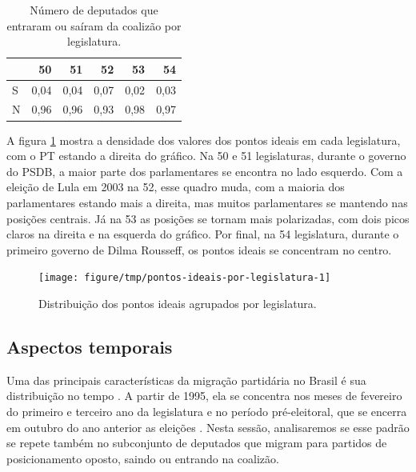 \documentclass[a4paper,titlepage]{ppgi}\usepackage[]{graphicx}\usepackage[]{color}
\newenvironment{knitrout}{}{} %
\begin{document}
\begin{table}
\centering
\begin{knitrout}
\color{fgcolor}
\begin{tabular}{l|r|r|r|r|r}
\hline
  & 50 & 51 & 52 & 53 & 54\\
\hline
S & 0,04 & 0,04 & 0,07 & 0,02 & 0,03\\
\hline
N & 0,96 & 0,96 & 0,93 & 0,98 & 0,97\\
\hline
\end{tabular}


\end{knitrout}
\caption{Número de deputados que entraram ou saíram da coalizão por legislatura.}
\label{table:coalition-changes-per-legislature}
\end{table}

A figura \ref{fig:pontos-ideais-por-legislatura} mostra a densidade dos valores
dos pontos ideais em cada legislatura, com o PT estando a direita do gráfico.
Na 50\textordfeminine{} e 51\textordfeminine{} legislaturas, durante o governo
do PSDB, a maior parte dos parlamentares se encontra no lado esquerdo. Com a
eleição de Lula em 2003 na 52\textordfeminine{}, esse quadro muda, com a
maioria dos parlamentares estando mais a direita, mas muitos parlamentares
se mantendo nas posições centrais. Já na 53\textordfeminine{} as posições se
tornam mais polarizadas, com dois picos claros na direita e na esquerda do
gráfico. Por final, na 54\textordfeminine{} legislatura, durante o primeiro
governo de Dilma Rousseff, os pontos ideais se concentram no centro.

\begin{knitrout}
\color{fgcolor}\begin{figure}
\texttt{[image: figure/tmp/pontos-ideais-por-legislatura-1]} \caption[Distribuição dos pontos ideais agrupados por legislatura]{Distribuição dos pontos ideais agrupados por legislatura.}\label{fig:pontos-ideais-por-legislatura}
\end{figure}


\end{knitrout}

\subsection{Aspectos temporais}
\label{sec:miolo:aspectos-temporais}



Uma das principais características da migração partidária no Brasil é sua
distribuição no tempo \cite{Araujo2000,Melo2004,Freitas2008}. A partir de 1995,
ela se concentra nos meses de fevereiro do primeiro e terceiro ano da
legislatura e no período pré-eleitoral, que se encerra em outubro do ano
anterior as eleições \cite{Freitas2008,Lei9504/1997}. Nesta sessão,
analisaremos se esse padrão se repete também no subconjunto de deputados que
migram para partidos de posicionamento oposto, saindo ou entrando na coalizão.
\end{document}
